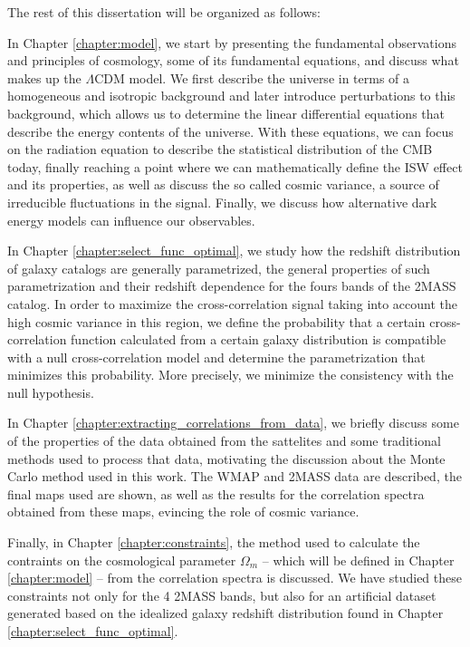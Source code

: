 \documentclass[openany,a4paper,12pt,oneside]{book}
\begin{document}
\begin{spacing}{1.5}
The rest of this dissertation will be organized as follows: 

In Chapter \ref{chapter:model}, we start by presenting the fundamental observations and principles of cosmology, some of its fundamental equations, and discuss what makes up the $\Lambda$CDM model. We first describe the universe in terms of a homogeneous and isotropic background and later introduce perturbations to this background, which allows us to determine the linear differential equations that describe the energy contents of the universe. With these equations, we can focus on the radiation equation to describe the statistical distribution of the CMB today, finally reaching a point where we can mathematically define the ISW effect and its properties, as well as discuss the so called cosmic variance, a source of irreducible fluctuations in the signal. Finally, we discuss how alternative dark energy models can influence our observables.

In Chapter \ref{chapter:select_func_optimal}, we study how the redshift distribution of galaxy catalogs are generally parametrized, the general properties of such parametrization and their redshift dependence for the fours bands of the 2MASS catalog. In order to maximize the cross-correlation signal taking into account the high cosmic variance in this region, we define the probability that a certain cross-correlation function calculated from a certain galaxy distribution is compatible with a null cross-correlation model and determine the parametrization that minimizes this probability. More precisely, we minimize the consistency with the null hypothesis.

In Chapter \ref{chapter:extracting_correlations_from_data}, we briefly discuss some of the properties of the data obtained from the sattelites and some traditional methods used to process that data, motivating the discussion about the Monte Carlo method used in this work. The WMAP and 2MASS data are described, the final maps used are shown, as well as the results for the correlation spectra obtained from these maps, evincing the role of cosmic variance.

Finally, in Chapter \ref{chapter:constraints}, the method used to calculate the contraints on the cosmological parameter $\Omega_m$ -- which will be defined in Chapter \ref{chapter:model} -- from the correlation spectra is discussed. We have studied these constraints not only for the 4 2MASS bands, but also for an artificial dataset generated based on the idealized galaxy redshift distribution found in Chapter \ref{chapter:select_func_optimal}. 


\end{spacing}
\end{document}
